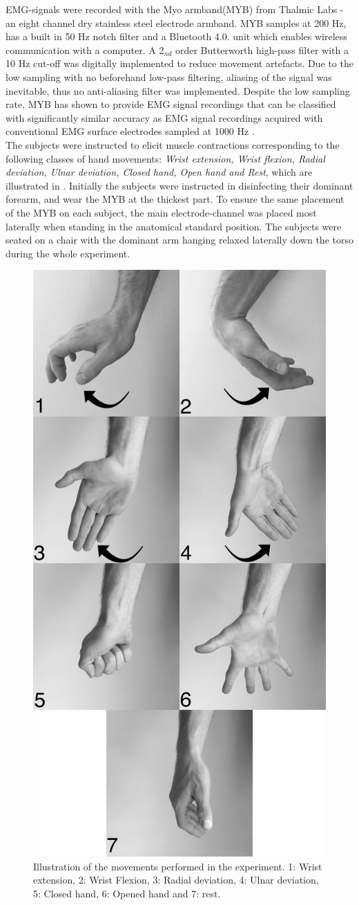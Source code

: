 EMG-signals were recorded with the Myo armband(MYB) from Thalmic Labs - an eight channel dry stainless steel electrode armband. MYB samples at 200 Hz, has a built in 50 Hz notch filter and a Bluetooth 4.0. unit which enables wireless communication with a computer. A 2$_{nd}$ order Butterworth high-pass filter with a 10 Hz cut-off was digitally implemented to reduce movement artefacts. Due to the low sampling with no beforehand low-pass filtering, aliasing of the signal was inevitable, thus no anti-aliasing filter was implemented. Despite the low sampling rate, MYB has shown to provide EMG signal recordings that can be classified with significantly similar accuracy as EMG signal recordings acquired with conventional EMG surface electrodes sampled at 1000 Hz \cite{Mendez2017}. \\
The subjects were instructed to elicit muscle contractions corresponding to the following classes of hand movements: \textit{Wrist extension, Wrist flexion, Radial deviation, Ulnar deviation, Closed hand, Open hand and Rest}, which are illustrated in . Initially the subjects were instructed in disinfecting their dominant forearm, and wear the MYB at the thickest part. To ensure the same placement of the MYB on each subject, the main electrode-channel was placed most laterally when standing in the anatomical standard position. The subjects were seated on a chair with the dominant arm hanging relaxed laterally down the torso during the whole experiment. \\

\begin{figure}[H]                 
	\includegraphics[width=.4\textwidth]{figures/Paper/allHandMovementsVerticalBW}  
	\caption{Illustration of the movements performed in the experiment. 1: Wrist extension, 2: Wrist Flexion, 3: Radial deviation, 4: Ulnar deviation, 5: Closed hand, 6: Opened hand and 7: rest.}
	\label{fig:P:experiment_movements} 
\end{figure}

